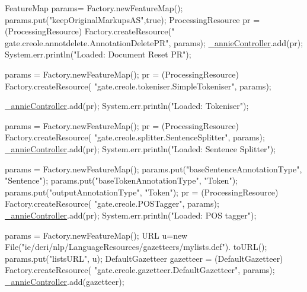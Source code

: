 \begin{DoxyCode}
        FeatureMap params= Factory.newFeatureMap();
        params.put(\textcolor{stringliteral}{"keepOriginalMarkupsAS"},\textcolor{keyword}{true});
        ProcessingResource pr = (ProcessingResource) Factory.createResource(\textcolor{stringliteral}{"
      gate.creole.annotdelete.AnnotationDeletePR"},
                params);
        \hyperlink{class_h_l_t_tutorial_ae3ecde0fc3f5486e117de53e615058ca}{\_annieController}.add(pr);
        System.err.println(\textcolor{stringliteral}{"Loaded: Document Reset PR"});


        params = Factory.newFeatureMap();
        pr = (ProcessingResource) Factory.createResource(
                \textcolor{stringliteral}{"gate.creole.tokeniser.SimpleTokeniser"}, params);

        \hyperlink{class_h_l_t_tutorial_ae3ecde0fc3f5486e117de53e615058ca}{\_annieController}.add(pr);
        System.err.println(\textcolor{stringliteral}{"Loaded: Tokeniser"});

        params = Factory.newFeatureMap();
        pr = (ProcessingResource) Factory.createResource(
                \textcolor{stringliteral}{"gate.creole.splitter.SentenceSplitter"}, params);
        \hyperlink{class_h_l_t_tutorial_ae3ecde0fc3f5486e117de53e615058ca}{\_annieController}.add(pr);
        System.err.println(\textcolor{stringliteral}{"Loaded: Sentence Splitter"});

        params = Factory.newFeatureMap();
        params.put(\textcolor{stringliteral}{"baseSentenceAnnotationType"}, \textcolor{stringliteral}{"Sentence"});
        params.put(\textcolor{stringliteral}{"baseTokenAnnotationType"}, \textcolor{stringliteral}{"Token"});
        params.put(\textcolor{stringliteral}{"outputAnnotationType"}, \textcolor{stringliteral}{"Token"});
        pr = (ProcessingResource) Factory.createResource(
                \textcolor{stringliteral}{"gate.creole.POSTagger"}, params);
        \hyperlink{class_h_l_t_tutorial_ae3ecde0fc3f5486e117de53e615058ca}{\_annieController}.add(pr);
        System.err.println(\textcolor{stringliteral}{"Loaded: POS tagger"});




        params = Factory.newFeatureMap();
        URL u=\textcolor{keyword}{new} File(\textcolor{stringliteral}{"ie/deri/nlp/LanguageResources/gazetteers/mylists.def"}).
      toURL();
        params.put(\textcolor{stringliteral}{"listsURL"}, u);
        DefaultGazetteer gazetteer = (DefaultGazetteer) Factory.createResource(\textcolor{stringliteral}{
      "gate.creole.gazetteer.DefaultGazetteer"}, params);
        \hyperlink{class_h_l_t_tutorial_ae3ecde0fc3f5486e117de53e615058ca}{\_annieController}.add(gazetteer);


\end{DoxyCode}
